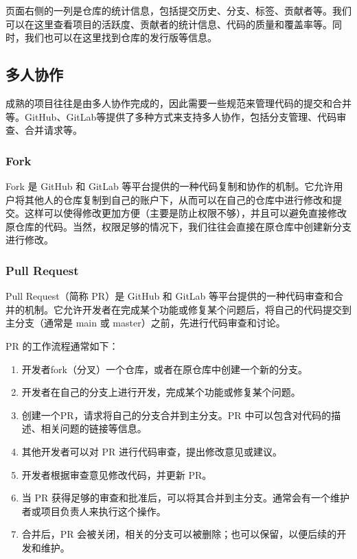 \documentclass[../main.tex]{subfiles}
\begin{document}
页面右侧的一列是仓库的统计信息，包括提交历史、分支、标签、贡献者等。我们可以在这里查看项目的活跃度、贡献者的统计信息、代码的质量和覆盖率等。同时，我们也可以在这里找到仓库的发行版等信息。

\subsection{多人协作}

成熟的项目往往是由多人协作完成的，因此需要一些规范来管理代码的提交和合并等。GitHub、GitLab等提供了多种方式来支持多人协作，包括分支管理、代码审查、合并请求等。

\subsubsection{Fork}

Fork 是 GitHub 和 GitLab 等平台提供的一种代码复制和协作的机制。它允许用户将其他人的仓库复制到自己的账户下，从而可以在自己的仓库中进行修改和提交。这样可以使得修改更加方便（主要是防止权限不够），并且可以避免直接修改原仓库的代码。当然，权限足够的情况下，我们往往会直接在原仓库中创建新分支进行修改。

\subsubsection{Pull Request}\label{sec:pull-request}
Pull Request（简称 PR）是 GitHub 和 GitLab 等平台提供的一种代码审查和合并的机制。它允许开发者在完成某个功能或修复某个问题后，将自己的代码提交到主分支（通常是 main 或 master）之前，先进行代码审查和讨论。

PR 的工作流程通常如下：

\begin{enumerate}
  \item 开发者fork（分叉）一个仓库，或者在原仓库中创建一个新的分支。
  \item 开发者在自己的分支上进行开发，完成某个功能或修复某个问题。
  \item 创建一个PR，请求将自己的分支合并到主分支。PR 中可以包含对代码的描述、相关问题的链接等信息。
  \item 其他开发者可以对 PR 进行代码审查，提出修改意见或建议。
  \item 开发者根据审查意见修改代码，并更新 PR。
  \item 当 PR 获得足够的审查和批准后，可以将其合并到主分支。通常会有一个维护者或项目负责人来执行这个操作。
  \item 合并后，PR 会被关闭，相关的分支可以被删除；也可以保留，以便后续的开发和维护。
\end{enumerate}
\end{document}
